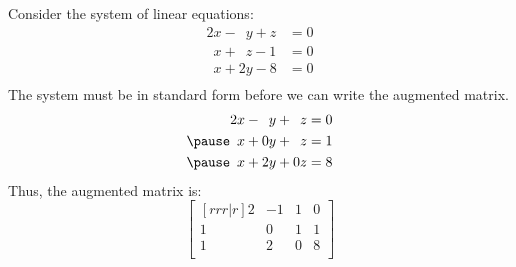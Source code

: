 \documentclass{beamer}
\begin{document}
\begin{frame}
\begin{example}
Consider the system of linear equations:
\begin{equation*}
\begin{aligned}
2x           - \phantom{2}y + z &= 0 \\
\phantom{2}x + \phantom{2}z - 1 &= 0 \\
\phantom{2}x + 2y           - 8 &= 0 \\
\end{aligned}
\end{equation*}\pause
{\small The system must be in standard form before we can write the augmented matrix.}\pause
\begin{equation*}
\begin{aligned}
2x           - \phantom{2}y + \phantom{0}z &= 0 \\\pause
\phantom{2}x + 0y           + \phantom{0}z &= 1 \\\pause
\phantom{2}x + 2y           + 0z           &= 8 \\
\end{aligned}
\end{equation*}\pause
Thus, the augmented matrix is:
\begin{equation*}
\begin{bmatrix}[rrr|r]
2 & -1 & 1 & 0 \\
1 &  0 & 1 & 1 \\
1 &  2 & 0 & 8 \\
\end{bmatrix}
\end{equation*}
\end{example}
\end{frame}
\end{document}

